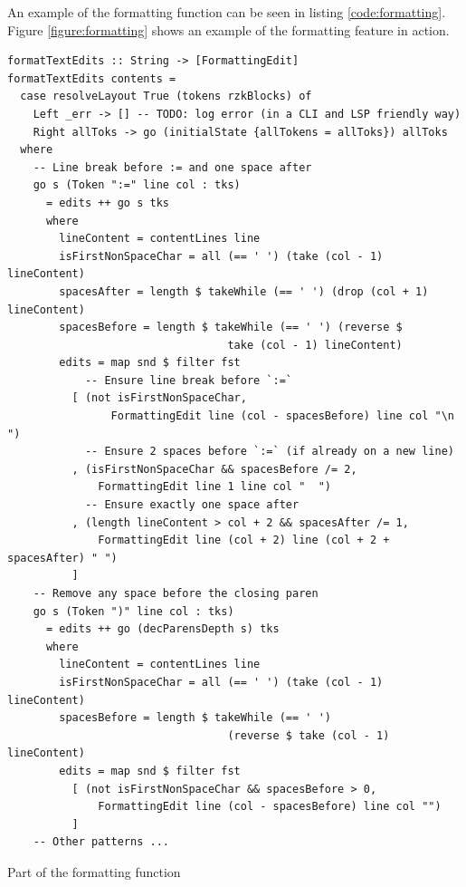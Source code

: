 An example of the formatting function can be seen in listing \ref{code:formatting}.
Figure \ref{figure:formatting} shows an example of the formatting feature in action.

\begin{listing}
  \begin{verbatim}
formatTextEdits :: String -> [FormattingEdit]
formatTextEdits contents =
  case resolveLayout True (tokens rzkBlocks) of
    Left _err -> [] -- TODO: log error (in a CLI and LSP friendly way)
    Right allToks -> go (initialState {allTokens = allToks}) allToks
  where
    -- Line break before := and one space after
    go s (Token ":=" line col : tks)
      = edits ++ go s tks
      where
        lineContent = contentLines line
        isFirstNonSpaceChar = all (== ' ') (take (col - 1) lineContent)
        spacesAfter = length $ takeWhile (== ' ') (drop (col + 1) lineContent)
        spacesBefore = length $ takeWhile (== ' ') (reverse $
                                  take (col - 1) lineContent)
        edits = map snd $ filter fst
            -- Ensure line break before `:=`
          [ (not isFirstNonSpaceChar,
                FormattingEdit line (col - spacesBefore) line col "\n  ")
            -- Ensure 2 spaces before `:=` (if already on a new line)
          , (isFirstNonSpaceChar && spacesBefore /= 2,
              FormattingEdit line 1 line col "  ")
            -- Ensure exactly one space after
          , (length lineContent > col + 2 && spacesAfter /= 1,
              FormattingEdit line (col + 2) line (col + 2 + spacesAfter) " ")
          ]
    -- Remove any space before the closing paren
    go s (Token ")" line col : tks)
      = edits ++ go (decParensDepth s) tks
      where
        lineContent = contentLines line
        isFirstNonSpaceChar = all (== ' ') (take (col - 1) lineContent)
        spacesBefore = length $ takeWhile (== ' ')
                                  (reverse $ take (col - 1) lineContent)
        edits = map snd $ filter fst
          [ (not isFirstNonSpaceChar && spacesBefore > 0,
              FormattingEdit line (col - spacesBefore) line col "")
          ]
    -- Other patterns ...
  \end{verbatim}
  \caption{Part of the formatting function}
  \label{code:formatting}
\end{listing}

